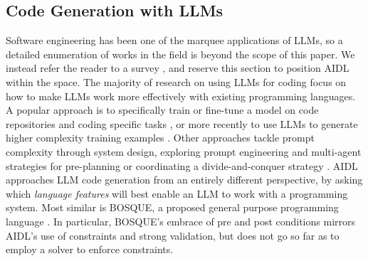 


\subsection{Code Generation with LLMs}

Software engineering has been one of the marquee applications of LLMs, so a detailed enumeration of works in the field is beyond the scope of this paper. We instead refer the reader to a survey \citet{zhang2024unifying}, and reserve this section to position AIDL within the space. The majority of research on using LLMs for coding focus on how to make LLMs work more effectively with existing programming languages. A popular approach is to specifically train or fine-tune a model on code repositories and coding specific tasks \citep{li_starcoder_2023,lozhkov_starcoder_2024,grattafiori2023code}, or more recently to use LLMs to generate higher complexity training examples \citep{xu_wizardlm_2023,luo_wizardcoder_2023}. Other approaches tackle prompt complexity through system design, exploring prompt engineering and multi-agent strategies for pre-planning or coordinating a divide-and-conquer strategy \citep{dong_self-collaboration_2023,bairi_codeplan_2023,silver_generalized_2023}. AIDL approaches LLM code generation from an entirely different perspective, by asking which \emph{language features} will best enable an LLM to work with a programming system. Most similar is BOSQUE, a proposed general purpose programming language \citep{marron_towards_2023}. In particular, BOSQUE's embrace of pre and post conditions mirrors AIDL's use of constraints and strong validation, but does not go so far as to employ a solver to enforce constraints.


